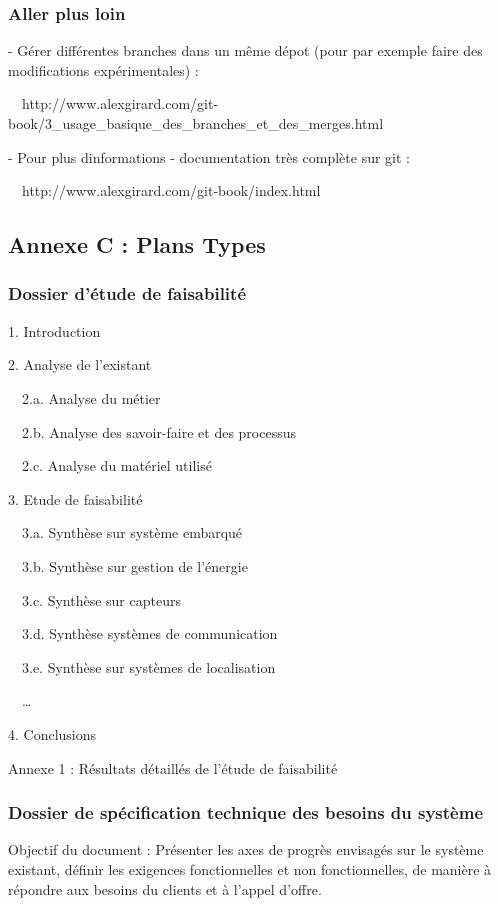 \documentclass{mise_en_page}
\begin{document}
\subsubsection{Aller plus loin}



{}- Gérer différentes branches dans un même dépot (pour par exemple
faire des modifications expérimentales) :

\ \ http://www.alexgirard.com/git-book/3\_usage\_basique\_des\_branches\_et\_des\_merges.html




{}- Pour plus d{\textquotesingle}informations - documentation très
complète sur git :

\ \ http://www.alexgirard.com/git-book/index.html




\subsection{Annexe C : Plans Types}
\subsubsection{Dossier d’étude de faisabilité}
1. Introduction

2. Analyse de l’existant

\ \ 2.a. Analyse du métier

\ \ 2.b. Analyse des savoir-faire et des processus

\ \ 2.c. Analyse du matériel utilisé

3. Etude de faisabilité

\ \ 3.a. Synthèse sur système embarqué

\ \ 3.b. Synthèse sur gestion de l’énergie

\ \ 3.c. Synthèse sur capteurs

\ \ 3.d. Synthèse systèmes de communication

\ \ 3.e. Synthèse sur systèmes de localisation

\ \ …

4. Conclusions

Annexe 1 : Résultats détaillés de l’étude de faisabilité

\subsubsection{Dossier de spécification technique des besoins du système}
Objectif du document : Présenter les axes de progrès envisagés sur le
système existant, définir les exigences fonctionnelles et non
fonctionnelles, de manière à répondre aux besoins du clients et à
l’appel d’offre.
\end{document}
